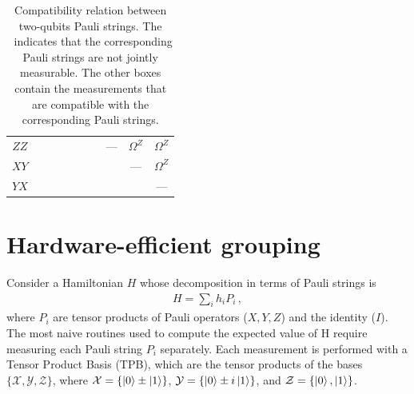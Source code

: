 \documentclass[11pt, twocolumn]{article}
\newcommand{\xmark}{\ding{54}}%
\begin{document}
\begin{table}
{\begin{tabular}{c|cccccccc|c|}
\multicolumn{1}{|c|}{$ZZ$} &                           &                                 &                                 &                                            &                                            & \multicolumn{1}{c|}{}                      & \multicolumn{1}{c|}{---}                   & $\Omega^Z$            & $\Omega^Z$            \\ \cline{1-1} \cline{8-10} 
\multicolumn{1}{|c|}{$XY$} &                           &                                 &                                 &                                            &                                            &                                            & \multicolumn{1}{c|}{}                      & ---                   & $\Omega^Z$            \\ \cline{1-1} \cline{9-10} 
\multicolumn{1}{|c|}{$YX$} &                           &                                 &                                 &                                            &                                            &                                            &                                            &                       & ---                   \\ \cline{1-1} \cline{10-10} \hline  
\end{tabular}}
\caption{Compatibility relation between two-qubits Pauli strings. The \xmark\ indicates that the corresponding Pauli strings are not jointly measurable. The other boxes contain the measurements that are compatible with the corresponding Pauli strings.}
\label{table1}
\end{table}


\section{Hardware-efficient grouping}

Consider a Hamiltonian $H$ whose decomposition in terms of Pauli strings is
\begin{align}\label{eq1}
    H =\sum_i h_i P_i\,,
\end{align}
where $P_i$ are tensor products of Pauli operators ($X,Y,Z$) and the identity ($I$). The most naive routines used to compute the expected value of H require measuring each Pauli string $P_i$ separately. Each measurement is performed with a Tensor Product Basis (TPB), which are the tensor products of the bases $\{\mathcal{X},\mathcal{Y},\mathcal{Z}\}$, where $\mathcal{X}=\{\ket{0}\pm\ket{1}\}$, $\mathcal{Y}=\{\ket{0}\pm i\ket{1}\}$, and  $\mathcal{Z}=\{\ket{0},\ket{1}\}$. 
\end{document}
